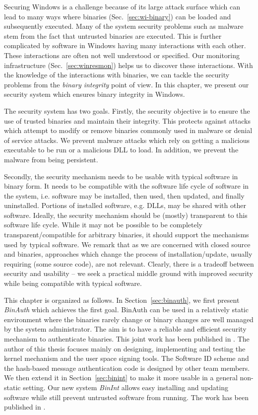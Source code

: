 
Securing Windows is a challenge because of its large
attack surface which can lead to many ways where
binaries (Sec.~\ref{sec:wi-binary}) can be loaded and subsequently executed.
Many of the system security problems such as malware
stem from the fact that untrusted binaries are executed.
This is further complicated by
software in Windows having many interactions with each other.
These interactions are often not well understood or specified.
Our monitoring infrastructure (Sec.~\ref{sec:winresmon}) helps
us to discover these interactions.
With the knowledge of the interactions with binaries,
we can tackle the security problems from the {\em binary integrity}
point of view.
In this chapter, we present our security system which ensures
binary integrity in Windows.

The security system has two goals. Firstly, the security objective
is to ensure the use of trusted binaries and maintain their integrity.
This protects against attacks which attempt to modify or remove binaries
commonly used in malware or denial of service attacks.
We prevent malware attacks which rely on
getting a malicious executable to be run or
a malicious DLL to load.
In addition, we prevent the malware from being persistent.

Secondly, the security mechanism needs to be usable with typical
software in binary form.
It needs to be compatible with the software life cycle of software in the
system, i.e.
software may be installed, then used, then updated, and 
finally uninstalled. 
Portions of installed software, e.g. DLLs,
may be shared with other software. 
Ideally, the security mechanism should be (mostly) transparent to 
this software life cycle.
While it may not be possible to be completely transparent/compatible 
for arbitrary binaries, it should support the mechanisms used 
by typical software.
We remark that as we are concerned with
closed source and binaries,
approaches which change the process of installation/update,
usually requiring (some source code), are not relevant.
Clearly, there is a tradeoff between security and usability --
we seek a practical middle ground with improved security while
being compatible with typical software.

This chapter is organized as follows.
In Section~\ref{sec:binauth},
we first present {\em BinAuth} which achieves the first goal.
BinAuth can be used in a relatively static environment where the binaries 
rarely change or binary changes are well managed by the system administrator.
The aim is to have a reliable and efficient security mechanism
to authenticate binaries.
This joint work has been published in \cite{halim2008lightweight,wu2009esi}.
The author of this thesis focuses mainly on designing, implementing and testing
the kernel mechanism and the user space signing tools.
The Software ID scheme and the hash-based message authentication code
is designed by other team members.
We then extend it in Section~\ref{sec:binint} to make it more usable
in a general non-static setting.
Our new system {\em BinInt} allows easy installing and updating software
while still prevent untrusted software from running.
The work has been published in \cite{wu2011towards}.
